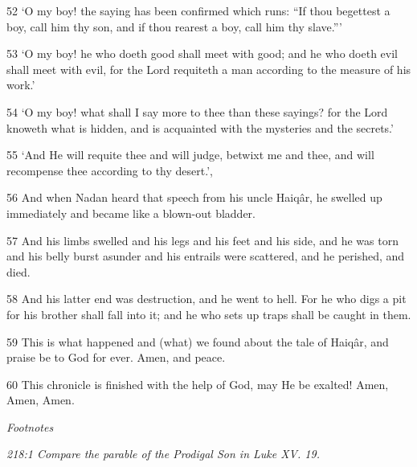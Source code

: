 \par 52 ‘O my boy! the saying has been confirmed which runs: “If thou begettest a boy, call him thy son, and if thou rearest a boy, call him thy slave.”’

\par 53 ‘O my boy! he who doeth good shall meet with good; and he who doeth evil shall meet with evil, for the Lord requiteth a man according to the measure of his work.’

\par 54 ‘O my boy! what shall I say more to thee than these sayings? for the Lord knoweth what is hidden, and is acquainted with the mysteries and the secrets.’

\par 55 ‘And He will requite thee and will judge, betwixt me and thee, and will recompense thee according to thy desert.’,

\par 56 And when Nadan heard that speech from his uncle Haiqâr, he swelled up immediately and became like a blown-out bladder.

\par 57 And his limbs swelled and his legs and his feet and his side, and he was torn and his belly burst asunder and his entrails were scattered, and he perished, and died.

\par 58 And his latter end was destruction, and he went to hell. For he who digs a pit for his brother shall fall into it; and he who sets up traps shall be caught in them.

\par 59 This is what happened and (what) we found about the tale of Haiqâr, and praise be to God for ever. Amen, and peace.

\par 60 This chronicle is finished with the help of God, may He be exalted! Amen, Amen, Amen.

\par \textit{Footnotes}

\par \textit{218:1 Compare the parable of the Prodigal Son in Luke XV. 19.}


